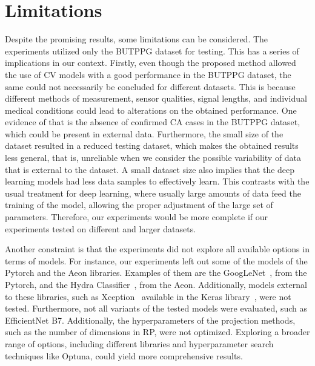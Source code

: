 




\section{Limitations}
\label{sec:Limitations}

Despite the promising results, some limitations can be considered. The experiments utilized only the BUTPPG dataset for testing. This has a series of implications in our context. Firstly, even though the proposed method allowed the use of \gls{CV} models with a good performance in the BUTPPG dataset, the same could not necessarily be concluded for different datasets. This is because different methods of measurement, sensor qualities, signal lengths, and individual medical conditions could lead to alterations on the obtained performance. One evidence of that is the absence of confirmed \gls{CA} cases in the \gls{BUTPPG} dataset, which could be present in external data. Furthermore, the small size of the dataset resulted in a reduced testing dataset, which makes the obtained results less general, that is, unreliable when we consider the possible variability of data that is external to the dataset. A small dataset size also implies that the deep learning models had less data samples to effectively learn. This contrasts with the usual treatment for deep learning, where usually large amounts of data feed the training of the model, allowing the proper adjustment of the large set of parameters. Therefore, our experiments would be more complete if our experiments tested on different and larger datasets.

Another constraint is that the experiments did not explore all available options in terms of models. For instance, our experiments left out some of the models of the Pytorch and the Aeon libraries. Examples of them are the GoogLeNet~\cite{GoogLeNet}, from the Pytorch, and the Hydra Classifier~\cite{HydraClassifier}, from the Aeon.  Additionally, models external to these libraries, such as Xception~\cite{Xception} available in the Keras library~\cite{Keras}, were not tested. Furthermore, not all variants of the tested models were evaluated, such as EfficientNet B7. Additionally, the hyperparameters of the projection methods, such as the number of dimensions in \gls{RP}, were not optimized. Exploring a broader range of options, including different libraries and hyperparameter search techniques like Optuna, could yield more comprehensive results.




